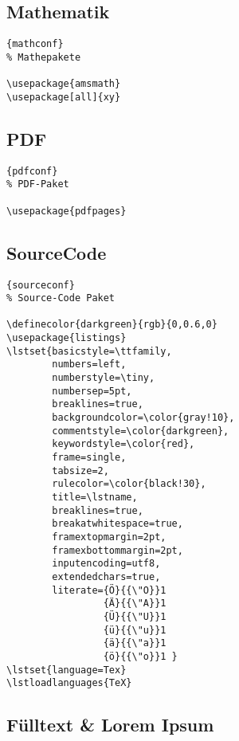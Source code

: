 \subsection{Mathematik}

\begin{center}
\begin{lstlisting}[caption=Mathematik]{mathconf}
% Mathepakete

\usepackage{amsmath}
\usepackage[all]{xy}
\end{lstlisting}
\end{center}

\subsection{PDF}

\begin{center}
\begin{lstlisting}[caption=PDF-Paket]{pdfconf}
% PDF-Paket

\usepackage{pdfpages}
\end{lstlisting}
\end{center}

\subsection{SourceCode}

\begin{center}
\begin{lstlisting}[caption=Source-Code Paket]{sourceconf}
% Source-Code Paket

\definecolor{darkgreen}{rgb}{0,0.6,0}
\usepackage{listings} 
\lstset{basicstyle=\ttfamily,
        numbers=left,
        numberstyle=\tiny, 
        numbersep=5pt,
        breaklines=true,
        backgroundcolor=\color{gray!10},
        commentstyle=\color{darkgreen},
        keywordstyle=\color{red},
        frame=single,
        tabsize=2,
        rulecolor=\color{black!30},
        title=\lstname,
        breaklines=true,
        breakatwhitespace=true,
        framextopmargin=2pt,
        framexbottommargin=2pt,
        inputencoding=utf8,
        extendedchars=true,
        literate={Ö}{{\"O}}1
                 {Ä}{{\"A}}1
                 {Ü}{{\"U}}1
                 {ü}{{\"u}}1
                 {ä}{{\"a}}1
                 {ö}{{\"o}}1 }
\lstset{language=Tex}
\lstloadlanguages{TeX}
\end{lstlisting}
\end{center}

\subsection{Fülltext \& Lorem Ipsum}

